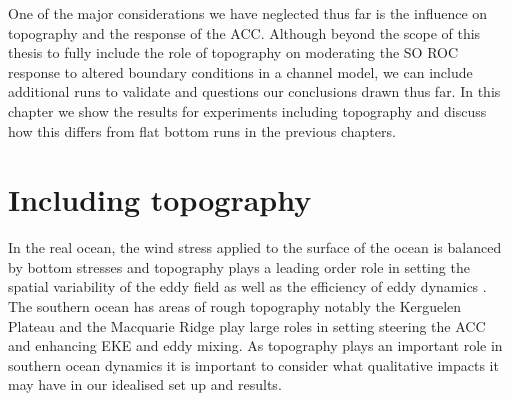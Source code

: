 \label{chap:5}

One of the major considerations we have neglected thus far is the influence on topography and the response of the ACC. Although beyond the scope of this thesis to fully include the role of topography on moderating the SO ROC response to altered boundary conditions in a channel model, we can include additional runs to validate and questions our conclusions drawn thus far. In this chapter we show the results for experiments including topography and discuss how this differs from flat bottom runs in the previous chapters.  

\section{Including topography}
In the real ocean, the wind stress applied to the surface of the ocean is balanced by bottom stresses and topography plays a leading order role in setting the spatial variability of the eddy field \citep{Thompson2008} as well as the efficiency of eddy dynamics \cite{Abernathey2014}. The southern ocean has areas of rough topography notably the Kerguelen Plateau and the Macquarie Ridge play large roles in setting steering the ACC and enhancing EKE and eddy mixing. As topography plays an important role in southern ocean dynamics it is important to consider what qualitative impacts it may have in our idealised set up and results. 

